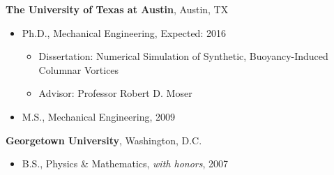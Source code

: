 %
\textbf{The University of Texas at Austin}, 
Austin, TX
\begin{itemize}

\item Ph.D., 
        Mechanical Engineering, Expected: 2016
        \begin{itemize}
        \item Dissertation: Numerical Simulation of Synthetic, 
	      Buoyancy-Induced Columnar Vortices
        \item Advisor: Professor Robert D. Moser
        \end{itemize}

\item M.S., 
        Mechanical Engineering, 2009 

\end{itemize}

\textbf{Georgetown University}, 
Washington, D.C. 
\begin{itemize}

\item B.S., 
        Physics \& Mathematics, \emph{with honors}, 2007
\end{itemize}


